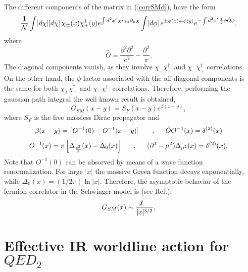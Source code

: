 \documentclass[a4paper,12pt]{article}
\begin{document}
The different components of the matrix in (\ref{corrSMd}), have the form
\begin{equation}
\frac{1}{\cal N}\int [d\chi][d\bar{\chi}]\, \chi_\pm (x)\chi^\dagger_\pm(y) e^{\int d^2x'\, \bar{\chi}{i\gamma_{\mu}\partial_{\mu}} \chi} \int [d\phi]\, e^{\pm\phi(x)\mp\phi(y)} e^{-\int d^2x'\, \frac{1}{2}\phi\hat{O}\phi},
\end{equation}
where
\begin{equation}
\hat{O}=\frac{\partial^2\partial^2}{e^2}-\frac{\partial^2}{\pi}.
\end{equation}
The diagonal components vanish, as they involve
$\chi_+ \chi^\dagger_-$ and $\chi_- \chi^\dagger_+$ correlations. On the other hand, the
$\phi$-factor associated with the off-diagonal components is the same for both  
$\chi_+ \chi^\dagger_+$ and $\chi_- \chi^\dagger_-$ correlations. Therefore, performing the gaussian path integral the well known result is obtained,
\begin{equation}
G_{SM}(x-y)=S_F(x-y)e^{\beta(x-y)},
\label{wk}
\end{equation}
where $S_F$ is the free massless Dirac propagator and
\begin{equation}
\beta(x-y)=\left[O^{-1}(0) -O^{-1}(x-y)\right]\makebox[.5in]{,}
\hat{O} O^{-1}(x)=\delta^{(2)}(x)
\end{equation}
\begin{equation}
O^{-1}(x)=\pi\left[ \Delta_{\frac{e^2}{\pi}}(x)-\Delta_0(x)\right]\makebox[.5in]{,}
(\partial^2-\mu^2)\Delta_{\mu^2}(x)=\delta^{(2)}(x).
\label{inverse}
\end{equation}
Note that $O^{-1}(0)$ can be absorved by means of a wave function renormalization. For large
$|x|$ the massive Green function decays exponentially, while $\Delta_0(x)=(1/2\pi)\ln |x|$. Therefore, the asymptotic behavior of the fermion correlator in the Schwinger model is 
(see Ref.\cite{st}),
\begin{equation}
G_{SM}(x)\sim \frac{\not\! x~~~}{|x|^{3/2}}.
\end{equation} 


\section{Effective IR worldline action for $QED_2$}
\end{document}
